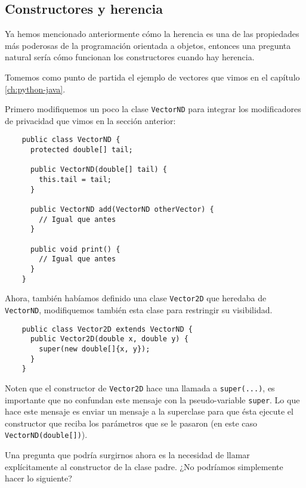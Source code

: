 \subsection{Constructores y herencia}
  Ya hemos mencionado anteriormente cómo la herencia es una de las propiedades más poderosas de la
  programación orientada a objetos, entonces una pregunta natural sería cómo funcionan los 
  constructores cuando hay herencia.

  Tomemos como punto de partida el ejemplo de vectores que vimos en el capítulo 
  \ref{ch:python-java}.

  Primero modifiquemos un poco la clase \texttt{VectorND} para integrar los modificadores de 
  privacidad que vimos en la sección anterior:

  \begin{verbatim}
    public class VectorND {
      protected double[] tail;

      public VectorND(double[] tail) {
        this.tail = tail;
      }

      public VectorND add(VectorND otherVector) {
        // Igual que antes
      }

      public void print() {
        // Igual que antes
      }
    }
  \end{verbatim}
  
  Ahora, también habíamos definido una clase \texttt{Vector2D} que heredaba de \texttt{VectorND},
  modifiquemos también esta clase para restringir su visibilidad.

  \begin{verbatim}
    public class Vector2D extends VectorND {
      public Vector2D(double x, double y) {
        super(new double[]{x, y});
      }
    }
  \end{verbatim}

  Noten que el constructor de \texttt{Vector2D} hace una llamada a \texttt{super(...)}, 
  es importante que no confundan este mensaje con la pseudo-variable \texttt{super}.
  Lo que hace este mensaje es enviar un mensaje a la superclase para que ésta ejecute el constructor
  que reciba los parámetros que se le pasaron (en este caso \texttt{VectorND(double[])}).

  Una pregunta que podría surgirnos ahora es la necesidad de llamar explícitamente al constructor
  de la clase padre.
  ¿No podríamos simplemente hacer lo siguiente?

